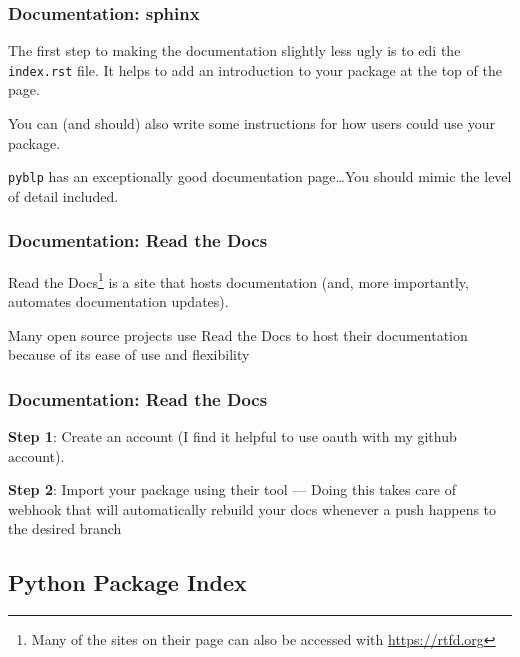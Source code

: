\documentclass[10pt]{beamer}
\begin{document}
  \begin{frame} \frametitle{Documentation: sphinx}

    The first step to making the documentation slightly less ugly is to edi the
    \texttt{index.rst} file. It helps to add an introduction to your package at the top
    of the page.

    \vspace{0.25cm}

    You can (and should) also write some instructions for how users could use your
    package.

    \vspace{0.25cm}

    \texttt{pyblp} has an exceptionally good documentation page\dots You should mimic
    the level of detail included.

  \end{frame}

  \begin{frame} \frametitle{Documentation: Read the Docs}

    Read the Docs\footnote{Many of the sites on their page can also be accessed with
    \href{https://www.urbandictionary.com/define.php?term=RTFD}{https://rtfd.org}} is a
    site that hosts documentation (and, more importantly, automates documentation
    updates).

    \vspace{0.25cm}

    Many open source projects use Read the Docs to host their documentation because of
    its ease of use and flexibility

  \end{frame}

  \begin{frame} \frametitle{Documentation: Read the Docs}

    \textbf{Step 1}: Create an account (I find it helpful to use oauth with my github
    account).

    \vspace{0.25cm}

    \textbf{Step 2}: Import your package using their tool --- Doing this takes care of
    webhook that will automatically rebuild your docs whenever a push happens
    to the desired branch

  \end{frame}

  \subsection{Python Package Index}
\end{document}

